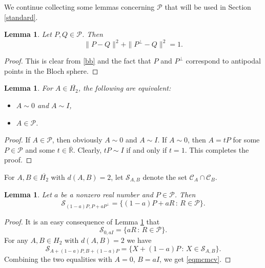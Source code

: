 \documentclass[10pt,a4paper]{amsart}
\providecommand{\index}[1]{}
\newcommand\cP{{\mathcal{P}}}
\newcommand\oH{{\overline{H_2}}}
\newcommand\oR{{\overline{\mathbb{R}}}}
\newtheorem{lemma}[theorem]{Lemma}
\theoremstyle{definition}
\theoremstyle{remark}
\numberwithin{subsection}{section}
\numberwithin{equation}{section}
\begin{document}
We continue collecting some lemmas concerning $\cP$ that will be used in Section \ref{standard}.
\begin{lemma}\label{matrum}
Let $P,Q \in \mathcal{P}$. Then
\[
\| P -Q \|^2 + \| P^\perp - Q\|^2 = 1.
\]
\end{lemma}
\begin{proof}
This is clear from \eqref{bb} and the fact that $P$ and $P^{\perp}$ correspond to antipodal points in the Bloch sphere.
\end{proof}


\begin{lemma}\label{veryeasy}
For $A\in \oH$, the following are equivalent:
\begin{itemize}
\item $A \sim 0$ and $A\sim I$,
\item $A \in \mathcal{P}$.
\end{itemize}
\end{lemma}
\begin{proof}
If $A \in \mathcal{P}$, then obviously $A \sim 0$ and $A\sim I$. If $A \sim 0$, then $A = tP$ for some $P \in \mathcal{P}$ and some $t \in {\oR}$. Clearly, $tP \sim I$ if and only if $t=1$. This completes the proof.
\end{proof}


For $A,B \in \oH$ with $d(A,B) = 2$, let $\mathcal{S}_{A,B}$ \index{$S(A,B)$@$\mathcal{S}_{A,B}$} denote the set $\mathcal{C}_A \cap \mathcal{C}_B$. 


\begin{lemma}\label{mcmcv}
Let $a$ be a nonzero real number and $P \in \mathcal{P}$. 
Then
\begin{equation}\label{eqmcmcv}
\mathcal{S}_{(1-a)P, P + aP^\perp} = \{ (1-a)P + aR\, : \, R \in \mathcal{P} \}.
\end{equation}
\end{lemma}
\begin{proof}
It is an easy consequence of Lemma \ref{veryeasy} that
\[
\mathcal{S}_{0, aI} = \{  aR\, : \, R \in \mathcal{P} \}.
\]
For any $A,B \in H_2$ with $d(A,B) = 2$ we have
\[
\mathcal{S}_{A + (1-a)P, B + (1-a) P} =  \{X+(1-a)P \,:\, X\in\mathcal{S}_{A,B}\}.
\] 
Combining the two equalities with $A=0$, $B=aI$, we get \eqref{eqmcmcv}.
\end{proof}
\end{document}
